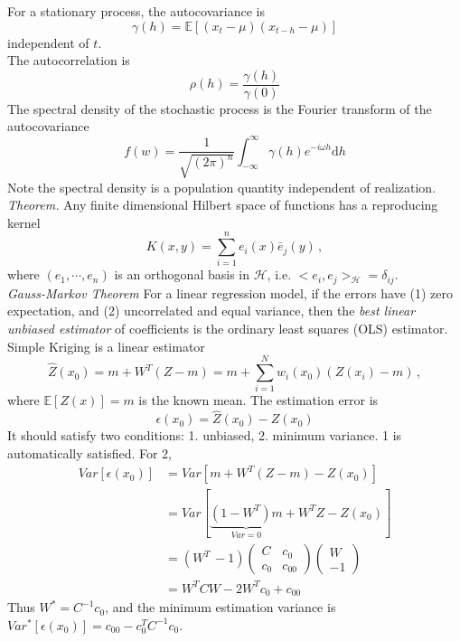 \documentclass[a4paper,onecolumn]{article}
\begin{document}
\noindent For a stationary process, the autocovariance is
$$
    \gamma (h) = \mathbb{E}\left[(x_t-\mu)(x_{t-h}-\mu)\right]
$$
independent of $t$.\\
\noindent The autocorrelation is
$$
    \rho(h) = \frac{\gamma(h)}{\gamma(0)}
$$
\noindent The spectral density of the stochastic process is
the Fourier transform of the autocovariance
$$
    f(w) = \frac{1}{\sqrt{(2\pi)^n}}\int_{-\infty}^{\infty} \gamma(h) e^{-i\omega h} \textrm{d}h
$$
Note the spectral density is a population quantity independent of realization.\\

\noindent \emph{Theorem.} Any finite dimensional Hilbert space of functions has a reproducing kernel
$$
    K(x,y) = \sum_{i=1}^n e_i(x) \bar{e}_j(y)\,,
$$
where $(e_1, \cdots, e_n)$ is an orthogonal basis in $\mathcal{H}$, i.e. $<e_i, e_j>_\mathcal{H} = \delta_{ij}$.\\

\noindent \emph{Gauss-Markov Theorem} For a linear regression model, if the errors have (1) zero expectation, and
(2) uncorrelated and equal variance, then the \emph{best linear unbiased estimator} of coefficients 
is the ordinary least squares (OLS) estimator.\\

\noindent Simple Kriging is a linear estimator
$$
    \hat{Z}(x_0) = m + W^T (Z-m) = m+\sum_{i=1}^N w_i(x_0) \left(Z(x_i) - m\right)\,,
$$
where $\mathbb{E}[Z(x)] = m$ is the known mean. The estimation error is
$$
    \epsilon(x_0) = \hat{Z}(x_0) - Z(x_0)
$$
It should satisfy two conditions: 1. unbiased, 2. minimum variance. 1 is automatically satisfied. For 2,
\begin{equation*}\begin{split}
    Var\left[\epsilon(x_0)\right] &= Var\left[ m + W^T\left(Z-m\right) - Z(x_0) \right]\\
    &= Var\left[\underbrace{\left(1-W^T\right)m}_{Var=0} + W^T Z - Z(x_0)\right]\\
    &= \left(W^T\, -1\right)
       \begin{pmatrix}
           C & c_0\\
           c_0 & c_{00}
       \end{pmatrix}
       \begin{pmatrix}
           W\\
           -1
       \end{pmatrix}\\
    &= W^T C W - 2 W^T c_0 + c_{00}
\end{split}\end{equation*}
\noindent Thus $W^*= C^{-1}c_0$, and the minimum estimation variance is
$Var^*\left[\epsilon(x_0)\right] = c_{00} - c_0^T C^{-1} c_0$.\\
\end{document}
